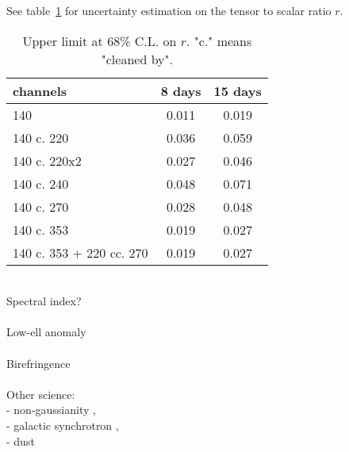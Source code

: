 See table~\ref{tab:rerrors} for uncertainty estimation on the tensor to scalar ratio $r$. 

\begin{table}[htp]
\begin{center}
\begin{tabular}{l|c|c}
channels & 8 days & 15 days \\
\hline
140 & 0.011 & 0.019\\
140 c. 220 & 0.036 & 0.059\\
140 c. 220x2 & 0.027 & 0.046\\
140 c. 240 & 0.048 & 0.071\\
140 c. 270 & 0.028 & 0.048\\
140 c. 353 & 0.019 & 0.027\\
140 c. 353 + 220 cc. 270  & 0.019 & 0.027\\
\end{tabular}
\end{center}
\caption{Upper limit at 68\% C.L. on $r$. "c." means "cleaned by". 
}
\label{tab:rerrors}
\end{table}%

~\\
Spectral index?  \\ \\
Low-ell anomaly \\ \\
Birefringence  \\ \\
Other science: \\
- non-gaussianity  , \\
- galactic synchrotron , \\
- dust 

